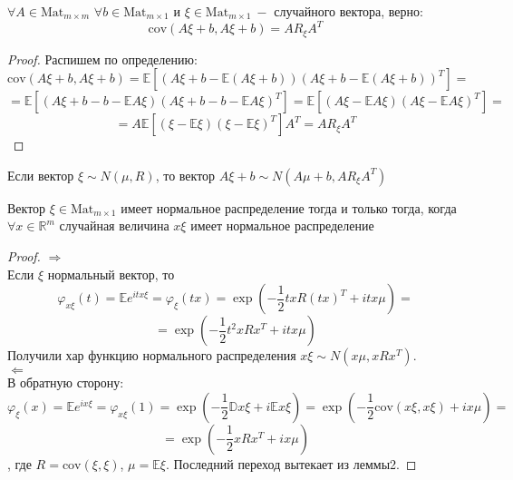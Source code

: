 \begin{advice}
$\forall A \in \text{Mat}_{m \times m}$ $\forall b \in \text{Mat}_{m \times 1}$ и $\xi \in \text{Mat}_{m \times 1} \ - $  случайного вектора, верно:
\[
    \text{cov} \left(A\xi + b, A \xi + b\right) = A R_\xi A ^ T
\]

\end{advice}
\begin{proof}
Распишем по определению: 
\[
    \text{cov} \left(A\xi + b, A \xi + b\right) = \mathbb{E} \left[\left(A \xi + b - \mathbb{E} \left(A\xi + b\right)\right) \left(A \xi + b - \mathbb{E} \left(A\xi +b\right)\right) ^ T\right] = 
\]
\[
    = \mathbb{E} \left[\left(A \xi + b - b - \mathbb{E} A\xi\right) \left(A \xi + b -b -  \mathbb{E} A\xi\right) ^ T\right] = \mathbb{E} \left[\left(A \xi  - \mathbb{E} A\xi\right) \left(A \xi  -  \mathbb{E} A\xi\right) ^ T\right] = 
    \]\[
    = A \mathbb{E} \left[\left(\xi  - \mathbb{E}\xi\right) \left(\xi  -  \mathbb{E}\xi\right) ^ T\right] A ^ T
    = A R_\xi A ^ T
\]
\end{proof}
\begin{corollary}
Если вектор $\xi \sim N\left(\mu, R\right)$, то вектор $A\xi + b \sim N\left(A\mu + b, A R_\xi A ^ T\right)$
\end{corollary}

\begin{theorem}
Вектор $\xi \in \text{Mat}_{m \times 1}$ имеет нормальное распределение тогда и только тогда, когда $\forall x \in \mathbb{R} ^ m$ случайная величина $ x\xi$ имеет нормальное распределение
\end{theorem}
\begin{proof}
$\Rightarrow$ \\
Если $\xi$ нормальный вектор, то 
\[
    \varphi_{x \xi} \left(t\right) = \mathbb{E} e ^ {it  x \xi } 
     = \varphi_{\xi}\left(tx\right) = \exp\left(-\frac12  txR \left(tx\right) ^ T + i  tx\mu\right) = 
\]
\[
    = \exp\left(-\frac12 t ^ 2 xR x^ T + it x \mu\right)
\]
Получили хар функцию нормального распределения $ x \xi \sim N\left(x \mu,  xR x^ T\right)$.\\
$\Leftarrow$ \\
В обратную сторону:
\[
    \varphi_{\xi}\left(x\right) = \mathbb{E} e ^ {i  x \xi } = \varphi_{ x \xi }\left(1\right) = \exp\left(-\frac12 \mathbb{D}  x \xi  + i\mathbb{E}  x \xi \right) = \exp\left(-\frac12  \text{cov} \left( x \xi ,  x \xi \right) + i  x \mu \right) = 
    \]\[
    = \exp\left(-\frac12   xR x^ T + i  x \mu \right)
\]
, где $R = \text{cov} \left(\xi, \xi\right)$, $\mu = \mathbb{E} \xi$. Последний переход вытекает из леммы2.
\end{proof}

